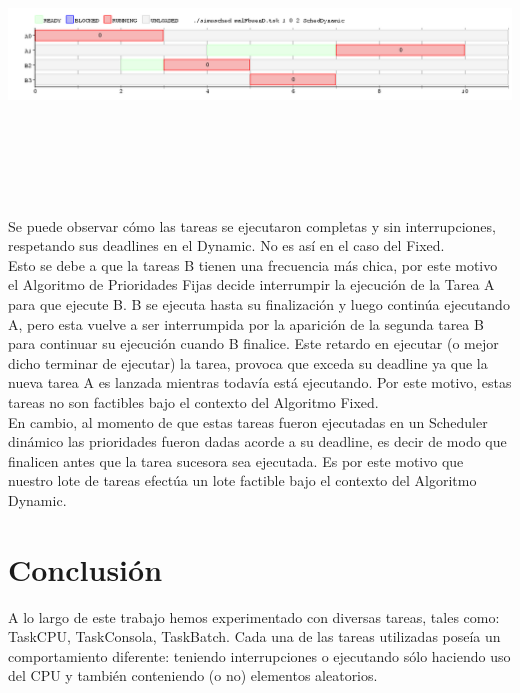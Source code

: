 \documentclass[a4paper]{article}
\begin{document}
\includegraphics[width=\textwidth,height=3.0in,keepaspectratio]{imagenes/ej9/dynamic.png} 

\bigskip

Se puede observar c\'omo las tareas se ejecutaron completas y sin interrupciones, respetando sus deadlines en el Dynamic. No es as\'i en el caso del Fixed.\\

Esto se debe a que la tareas B tienen una frecuencia m\'as chica, por este motivo el Algoritmo de Prioridades Fijas decide interrumpir la ejecuci\'on de la Tarea A para que ejecute B. B se ejecuta hasta su finalizaci\'on y luego contin\'ua ejecutando A, pero esta vuelve a ser interrumpida por la aparici\'on de la segunda tarea B para continuar su ejecuci\'on cuando B finalice. Este retardo en ejecutar (o mejor dicho terminar de ejecutar) la tarea, provoca que exceda su deadline ya que la nueva tarea A es lanzada mientras todav\'ia est\'a ejecutando.  Por este motivo, estas tareas no son factibles bajo el contexto del Algoritmo Fixed.\\

En cambio, al momento de que estas tareas fueron ejecutadas en un Scheduler din\'amico las prioridades fueron dadas acorde a su deadline, es decir de modo que finalicen antes que la tarea sucesora sea ejecutada. Es por este motivo que nuestro lote de tareas efect\'ua un lote factible bajo el contexto del Algoritmo Dynamic.





\newpage
 \section{Conclusión} 

A lo largo de este trabajo hemos experimentado con diversas tareas, tales como: TaskCPU, TaskConsola, TaskBatch. Cada una de las tareas utilizadas pose\'ia un comportamiento diferente: teniendo interrupciones o ejecutando s\'olo haciendo uso del CPU y tambi\'en conteniendo (o no) elementos aleatorios.
\end{document}
